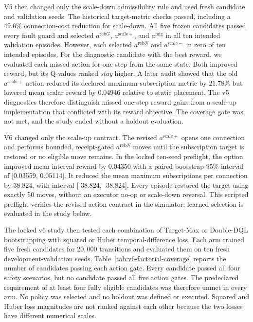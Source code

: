 V5 then changed only the scale-down admissibility rule and used fresh candidate
and validation seeds. The historical target-metric checks passed, including a
$49.6\%$ connection-cost reduction for scale-down. All five frozen candidates passed every fault guard and
selected $a^{\mathrm{reb}G}$, $a^{\mathrm{scale}+}$, and
$a^{\mathrm{mig}}$ in all ten intended validation episodes.  However, each
selected $a^{\mathrm{reb}N}$ and $a^{\mathrm{scale}-}$ in zero of ten intended
episodes.  For the diagnostic candidate with the best reward, we evaluated each missed
action for one step from the same state. Both improved reward, but its Q-values ranked \emph{stay}
higher. A later audit showed that the old $a^{\mathrm{scale}+}$ action reduced
its declared maximum-subscription metric by $21.78\%$ but lowered mean scalar
reward by 0.04946 relative to static placement. The v5 diagnostics therefore
distinguish missed one-step reward gains from a scale-up implementation that
conflicted with its reward objective. The coverage gate was not met, and the
study ended without a holdout evaluation.

V6 changed only the scale-up contract. The revised $a^{\mathrm{scale}+}$ opens
one connection and performs bounded, receipt-gated $a^{\mathrm{reb}N}$ moves
until the subscription target is restored or no eligible move remains. In the
locked ten-seed preflight, the option improved mean interval reward by 0.04350
with a paired bootstrap 95\% interval of [0.03559, 0.05114]. It reduced the
mean maximum subscriptions per connection by 38.824, with interval [-38.824,
-38.824]. Every episode restored the target using exactly 50 moves, without an
executor no-op or scale-down reversal. This scripted preflight verifies the
revised action contract in the simulator; learned selection is evaluated in
the study below.

The locked v6 study then tested each combination of Target-Max or Double-DQL
bootstrapping with squared or Huber temporal-difference loss. Each arm trained five fresh
candidates for $20{,}000$ transitions and evaluated them on ten fresh
development-validation seeds. Table~\ref{tab:v6-factorial-coverage} reports
the number of candidates passing each action gate. Every candidate passed all
four safety scenarios, but no candidate passed all five action gates. The
predeclared requirement of at least four fully eligible candidates was
therefore unmet in every arm. No policy was selected and no holdout was defined
or executed. Squared and Huber loss magnitudes are not ranked against each
other because the two losses have different numerical scales.

